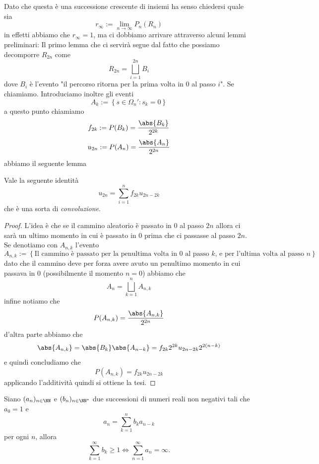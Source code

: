 \documentclass[11pt]{scrartcl}
\begin{document}
	Dato che questa è una successione crescente di insiemi ha senso chiedersi quale sia
	$$r_\infty:=\lim_{n\to\infty}P_n(R_n)$$
	in effetti abbiamo che $r_\infty=1$, ma ci dobbiamo arrivare attraverso alcuni lemmi preliminari:
	Il primo lemma che ci servirà segue dal fatto che possiamo decomporre $R_{2n}$ come
	$$R_{2n}=\bigsqcup_{i=1}^{2n}B_{i}$$
	dove $B_i$ è l'evento "il percorso ritorna per la prima volta in $0$ al passo $i$". Se chiamiamo. Introduciamo inoltre gli eventi
	$$A_k:=\left\{s\in \Omega_n':s_k=0\right\}$$
	a questo punto chiamiamo
	$$f_{2k}:=P(B_k)=\frac{\abs{B_k}}{2^{2k}}$$
	$$u_{2n}:=P(A_n)=\frac{\abs{A_n}}{2^{2n}}$$
	abbiamo il seguente lemma
	\begin{lemma}[Preliminare 1]
		Vale la seguente identità
		$$u_{2n}=\sum_{i=1}^{n}f_{2k}u_{2n-2k}$$
		che è una sorta di \textit{convoluzione}.
	\end{lemma}
	\begin{proof}
		L'idea è che se il cammino aleatorio è passato in $0$ al passo $2n$ allora ci sarà un ultimo momento in cui è passato in $0$ prima che ci passasse al passo $2n$. Se denotiamo con $A_{n,k}$ l'evento
		$$A_{n,k}:=\left\{\text{Il cammino è passato per la penultima volta in $0$ al passo $k$, e per l'ultima volta al passo $n$}\right\}$$
		dato che il cammino deve per forza avere avuto un penultimo momento in cui passava in $0$ (possibilmente il momento $n=0$) abbiamo che
		$$A_n=\bigsqcup_{k=1}^n A_{n,k}$$
		infine notiamo che
		$$P(A_{n,k})=\frac{\abs{A_{n,k}}}{2^{2n}}$$
		d'altra parte abbiamo che 
		$$\abs{A_{n,k}}=\abs{B_k}\abs{A_{n-k}}=f_{2k}2^{2k}u_{2n-2k}2^{2(n-k)}$$
		e quindi concludiamo che
		$$P(A_{n,k})=f_{2k}u_{2n-2k}$$
		applicando l'additività quindi si ottiene la tesi.
	\end{proof}
	\begin{lemma}[Preliminare 2]
		Siano $(a_n)_{n\in \NN}$ e $(b_n)_{n\in\NN^*}$ due successioni di numeri reali non negativi tali che $a_0=1$ e
		$$a_n=\sum_{k=1}^{n}b_ka_{n-k}$$
		per ogni $n$, allora 
		$$\sum_{k=1}^{\infty}b_k\ge 1 \iff \sum_{n=1}^{\infty}a_n=\infty.$$
	\end{lemma}
\end{document}
